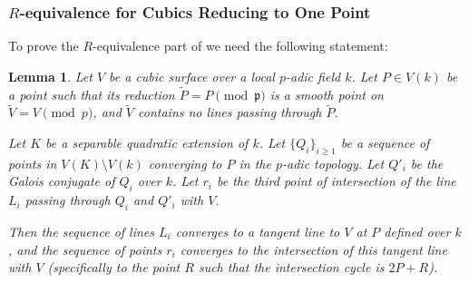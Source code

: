 \documentclass[11pt]{article}
\newtheorem{lemma}[theorem]{Lemma}
\theoremstyle{definition}
\begin{document}
\subsubsection{$R$-equivalence for Cubics Reducing to One Point}
To prove the $R$-equivalence part of  we need the following statement:
\begin{lemma}
\label{thm:tanglimit}
Let $V$ be a cubic surface over a local $p$-adic field $k$. Let $P \in V(k)$ be a point such that its reduction $\tilde{P} = P \pmod{\mathfrak{p}}$ is a smooth point on $\tilde{V} = V \pmod p$, and $\tilde{V}$ contains no lines passing through $\tilde{P}$.

Let $K$ be a separable quadratic extension of $k$. Let $\{Q_i\}_{i \ge 1}$ be a sequence of points in $V(K) \setminus V(k)$ converging to $P$ in the $p$-adic topology. Let $Q'_i$ be the Galois conjugate of $Q_i$ over $k$. Let $r_i$ be the third point of intersection of the line $L_i$ passing through $Q_i$ and $Q'_i$ with $V$.

Then the sequence of lines $L_i$ converges to a tangent line to $V$ at $P$ defined over $k$, and the sequence of points $r_i$ converges to the intersection of this tangent line with $V$ (specifically to the point $R$ such that the intersection cycle is $2P+R$).
\end{lemma}
\end{document}
